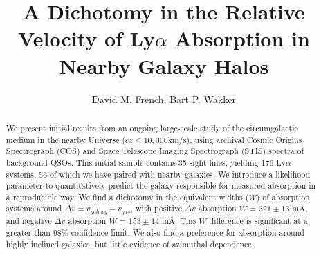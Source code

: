 \documentclass[iop]{emulateapj-rtx4}
\begin{document}

\title{A Dichotomy in the Relative Velocity of Ly$\alpha$ Absorption in Nearby Galaxy Halos}
\author{David M. French, Bart P. Wakker}



\begin{abstract}

We present initial results from an ongoing large-scale study of the circumgalactic medium in the nearby Universe ($cz \leq 10,000$km/s), using archival Cosmic Origins Spectrograph (COS) and Space Telescope Imaging Spectrograph (STIS) spectra of background QSOs. This initial sample contains 35 sight lines, yielding 176 Ly$\alpha$ systems, 56 of which we have paired with nearby galaxies. We introduce a likelihood parameter to quantitatively predict the galaxy responsible for measured absorption in a reproducible way. We find a dichotomy in the equivalent widths ($W$) of absorption systems around $\Delta v = v_{galaxy} - v_{gas}$, with positive $\Delta v$ absorption $W$ = $321 \pm 13$ m\AA, and negative $\Delta v$  absorption $W$ = $153 \pm 14$ m\AA. This $W$ difference is significant at a greater than $98\%$ confidence limit. We also find a preference for absorption around highly inclined galaxies, but little evidence of azimuthal dependence.



\end{abstract}


%
\end{document}
